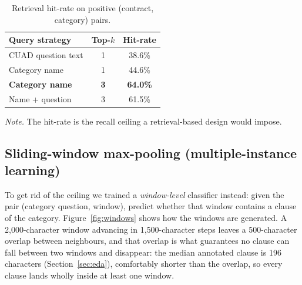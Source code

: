 \begin{table}[ht]
\centering
\caption{Retrieval hit-rate on positive (contract, category) pairs.}
\label{tab:retrieval}
\begin{tabular}{lcc}
\toprule
\textbf{Query strategy} & \textbf{Top-$k$} & \textbf{Hit-rate}\\
\midrule
CUAD question text        & 1 & 38.6\%\\
Category name             & 1 & 44.6\%\\
\textbf{Category name}    & \textbf{3} & \textbf{64.0\%}\\
Name + question           & 3 & 61.5\%\\
\bottomrule
\end{tabular}

{\footnotesize\singlespacing \emph{Note.} The hit-rate is the recall ceiling a retrieval-based design would impose.\par}
\end{table}

\subsection{Sliding-window max-pooling (multiple-instance learning)}
\label{sec:mil}
To get rid of the ceiling we trained a \emph{window-level} classifier instead: given the pair (category question, window), predict whether that window contains a clause of the category. Figure~\ref{fig:windows} shows how the windows are generated. A 2{,}000-character window advancing in 1{,}500-character steps leaves a 500-character overlap between neighbours, and that overlap is what guarantees no clause can fall between two windows and disappear: the median annotated clause is 196 characters (Section~\ref{sec:eda}), comfortably shorter than the overlap, so every clause lands wholly inside at least one window.

